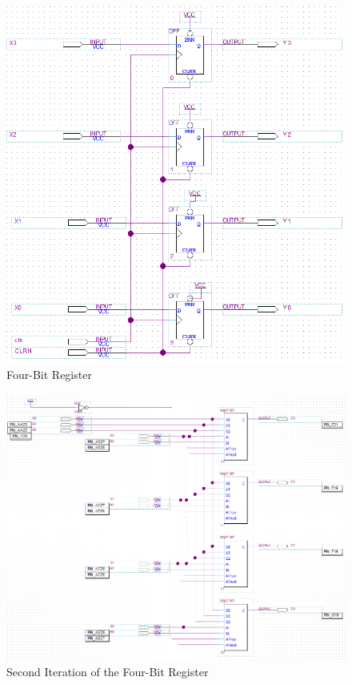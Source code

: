 \documentclass[a4paper,12pt]{article}
\begin{document}
\begin{figure}[H]
\includegraphics[width=\textwidth]{Diagrams/BlockDiagram_4BitRegister.PNG} 
\caption{Four-Bit Register}
\label{fig:FourBitRegister}
\end{figure}

\begin{figure}[H]
\includegraphics[width=\textwidth]{Diagrams/BlockDiagram_4BitRegister_VER2.PNG} 
\caption{Second Iteration of the Four-Bit Register}
\label{fig:FourBitRegisterSecondIteration}
\end{figure}
\end{document}
